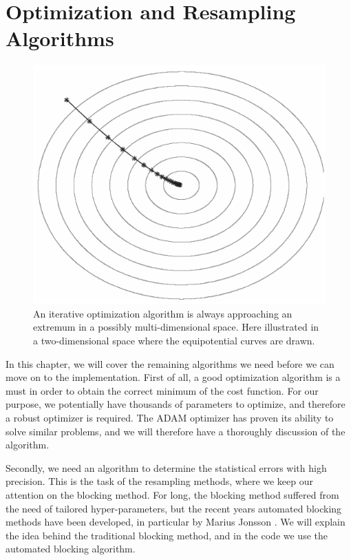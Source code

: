 \chapter{Optimization and Resampling Algorithms} \label{chp:optimization}
\begin{figure}[H]
	\centering
	\includegraphics[scale=0.4]{Images/gd_bw.png}
	\caption{An iterative optimization algorithm is always approaching an extremum in a possibly multi-dimensional space. Here illustrated in a two-dimensional space where the equipotential curves are drawn.}
\end{figure}

In this chapter, we will cover the remaining algorithms we need before we can move on to the implementation. First of all, a good optimization algorithm is a must in order to obtain the correct minimum of the cost function. For our purpose, we potentially have thousands of parameters to optimize, and therefore a robust optimizer is required. The ADAM optimizer has proven its ability to solve similar problems, and we will therefore have a thoroughly discussion of the algorithm.

Secondly, we need an algorithm to determine the statistical errors with high precision. This is the task of the resampling methods, where we keep our attention on the blocking method. For long, the blocking method suffered from the need of tailored hyper-parameters, but the recent years automated blocking methods have been developed, in particular by Marius Jonsson \cite{jonsson_standard_2018}. We will explain the idea behind the traditional blocking method, and in the code we use the automated blocking algorithm. 




